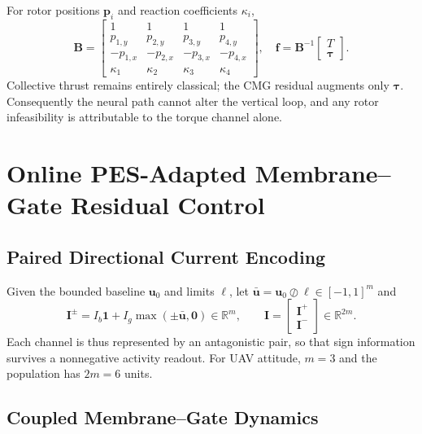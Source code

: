 \documentclass[letterpaper,10pt,conference]{IEEEtran}
\newcommand{\R}{\mathbb{R}}
\begin{document}
For rotor positions $\bm p_i$ and reaction coefficients $\kappa_i$,
\begin{equation}
    \bm B=\begin{bmatrix}
      1&1&1&1\\
      p_{1,y}&p_{2,y}&p_{3,y}&p_{4,y}\\
      -p_{1,x}&-p_{2,x}&-p_{3,x}&-p_{4,x}\\
      \kappa_1&\kappa_2&\kappa_3&\kappa_4
    \end{bmatrix},
    \quad
    \bm f=\bm B^{-1}\begin{bmatrix}T\\\bm\tau\end{bmatrix}.
    \label{eq:mixer}
\end{equation}
Collective thrust remains entirely classical; the CMG residual augments
only $\bm\tau$. Consequently the neural path cannot alter the vertical
loop, and any rotor infeasibility is attributable to the torque channel
alone.

\section{Online PES-Adapted Membrane--Gate Residual Control}
\label{sec:cmg_nengo}

\subsection{Paired Directional Current Encoding}

Given the bounded baseline $\bm u_0$ and limits $\bm\ell$, let
$\bar{\bm u}=\bm u_0\oslash\bm\ell\in[-1,1]^m$ and
\begin{equation}
    \bm I^{\pm}=I_b\bm 1+I_g\max(\pm\bar{\bm u},\bm 0)\in\R^m ,
    \qquad
    \bm I=\begin{bmatrix}\bm I^{+}\\\bm I^{-}\end{bmatrix}\in\R^{2m}.
    \label{eq:encode}
\end{equation}
Each channel is thus represented by an antagonistic pair, so that sign
information survives a nonnegative activity readout. For UAV attitude,
$m=3$ and the population has $2m=6$ units.

\subsection{Coupled Membrane--Gate Dynamics}
\end{document}
